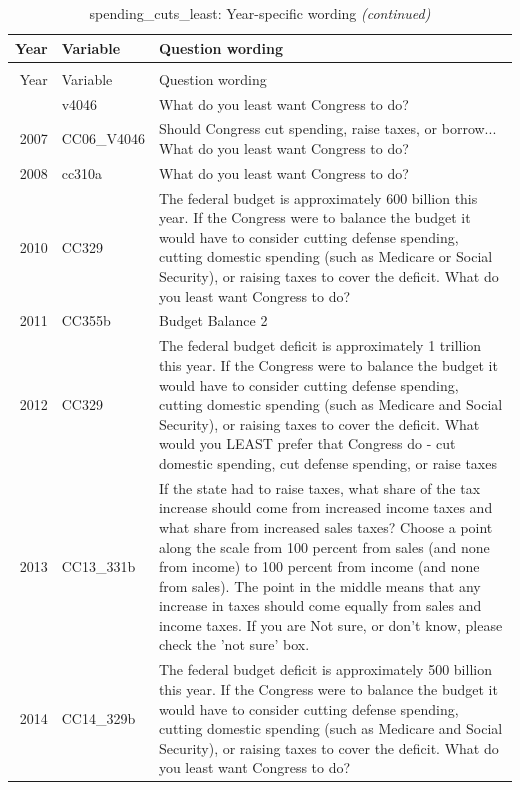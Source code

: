 \documentclass[12pt]{article}
\begin{document}
\begin{longtable}[t]{rl>{\raggedright\arraybackslash}p{10cm}}
\caption{\label{tab:unnamed-chunk-4}spending\_cuts\_least: Year-specific wording}\\
\toprule
Year & Variable & Question wording\\
\midrule
\endfirsthead
\caption[]{spending\_cuts\_least: Year-specific wording \textit{(continued)}}\\
\toprule
Year & Variable & Question wording\\
\midrule
\endhead
\
\endfoot
\bottomrule
\endlastfoot
2006 & v4046 & What do you least want Congress to do?\\
2007 & CC06\_V4046 & Should Congress cut spending, raise taxes, or borrow... What do you least want Congress to do?\\
2008 & cc310a & What do you least want Congress to do?\\
2010 & CC329 & The federal budget is approximately 600 billion this year. If the Congress were to balance the budget it would have to consider cutting defense spending, cutting domestic spending (such as Medicare or Social Security), or raising taxes to cover the deficit. What do you least want Congress to do?\\
2011 & CC355b & Budget Balance 2\\
2012 & CC329 & The federal budget deficit is approximately 1 trillion this year. If the Congress were to balance the budget it would have to consider cutting defense spending, cutting domestic spending (such as Medicare and Social Security), or raising taxes to cover the deficit. What would you LEAST prefer that Congress do - cut domestic spending, cut defense spending, or raise taxes\\
2013 & CC13\_331b & If the state had to raise taxes, what share of the tax increase should come from increased income taxes and what share from increased sales taxes? Choose a point along the scale from 100 percent from sales (and none from income) to 100 percent from income (and none from sales). The point in the middle means that any increase in taxes should come equally from sales and income taxes. If you are Not sure, or don't know, please check the 'not sure' box.\\
2014 & CC14\_329b & The federal budget deficit is approximately 500 billion this year. If the Congress were to balance the budget it would have to consider cutting defense spending, cutting domestic spending (such as Medicare and Social Security), or raising taxes to cover the deficit. What do you least want Congress to do?\\

\end{longtable}
\end{document}

